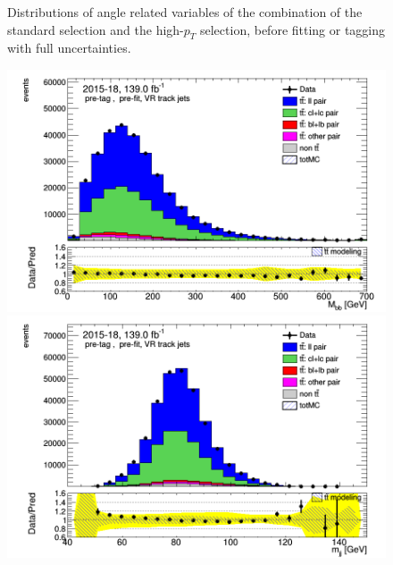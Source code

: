 \documentclass[letterpaper,12pt]{article}
\begin{document}
\begin{figure}
\begin{minipage}[b]{.45\textwidth}
\end{minipage}
\caption{Distributions of angle related variables of the combination of the standard selection and the high-$p_T$ selection, before fitting or tagging with full uncertainties.} \label{fig:angles_VRJets}
\end{figure}


\begin{figure}
\begin{minipage}[b]{.45\textwidth}
\centering
\includegraphics[width=1\textwidth]{Oct_distributions/pretagNoRwDL1rwithhighpTVRJets_scaledall/DataMC_Mbb.png}
\end{minipage}\hfill
\begin{minipage}[b]{.45\textwidth}
\centering
\includegraphics[width=1\textwidth]{Oct_distributions/pretagNoRwDL1rwithhighpTVRJets_scaledall/DataMC_mjj.png}
\end{minipage}
\begin{minipage}[b]{.45\textwidth}

\end{minipage}
\end{figure}
\end{document}
